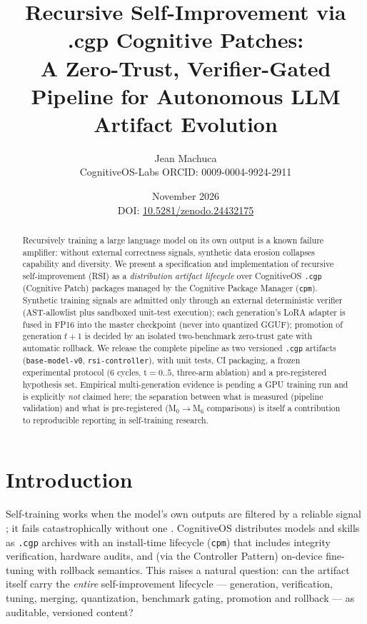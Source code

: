 \documentclass[11pt,a4paper]{article}
\title{Recursive Self-Improvement via .cgp Cognitive Patches:\\
A Zero-Trust, Verifier-Gated Pipeline for Autonomous LLM Artifact Evolution}
\author{Jean Machuca\\CognitiveOS-Labs \quad ORCID: 0009-0004-9924-2911}
\date{November 2026\\[0.4em]{\small DOI: \href{https://doi.org/10.5281/zenodo.24432175}{10.5281/zenodo.24432175}}}
\begin{document}
\maketitle

\begin{abstract}
Recursively training a large language model on its own output is a known
failure amplifier: without external correctness signals, synthetic data
erosion collapses capability and diversity. We present a specification
and implementation of recursive self-improvement (RSI) as a \emph{distribution
artifact lifecycle} over CognitiveOS \texttt{.cgp} (Cognitive Patch) packages
managed by the Cognitive Package Manager (\texttt{cpm}). Synthetic training
signals are admitted only through an external deterministic verifier
(AST-allowlist plus sandboxed unit-test execution); each generation's LoRA
adapter is fused in FP16 into the master checkpoint (never into quantized
GGUF); promotion of generation $t{+}1$ is decided by an isolated two-benchmark
zero-trust gate with automatic rollback. We release the complete pipeline as
two versioned \texttt{.cgp} artifacts (\texttt{base-model-v0},
\texttt{rsi-controller}), with unit tests, CI packaging, a frozen experimental
protocol (6 cycles, t$=0..5$, three-arm ablation) and a pre-registered
hypothesis set. Empirical multi-generation evidence is pending a GPU training
run and is explicitly \emph{not} claimed here; the separation between what is
measured (pipeline validation) and what is pre-registered (M$_0{\rightarrow}$M$_6$
comparisons) is itself a contribution to reproducible reporting in self-training research.
\end{abstract}

\section{Introduction}

Self-training works when the model's own outputs are filtered by a reliable
signal \cite{zelikman2022star, wang2023selfie, wei2022verifiers}; it fails
catastrophically without one \cite{shumailov2024nature}. CognitiveOS
distributes models and skills as \texttt{.cgp} archives with an
install-time lifecycle (\texttt{cpm}) that includes integrity verification,
hardware audits, and (via the Controller Pattern) on-device fine-tuning with
rollback semantics. This raises a natural question: can the artifact itself
carry the \emph{entire} self-improvement lifecycle --- generation,
verification, tuning, merging, quantization, benchmark gating, promotion and
rollback --- as auditable, versioned content?
\end{document}
